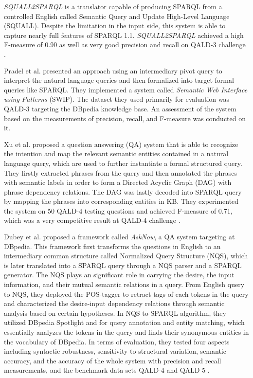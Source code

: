 \textit{SQUALL2SPARQL} \cite{ferre:hal-00943522} is a translator capable of producing SPARQL from a controlled English called Semantic Query and Update High-Level Language (SQUALL). Despite the limitation in the input side, this system is able to capture nearly full features of SPARQL 1.1. \textit{SQUALL2SPARQL} achieved a high F-measure of 0.90 as well as very good precision and recall on QALD-3 challenge \cite{cabrio2013qald}.

Pradel et al. \cite{Pradel2013} presented an approach using an intermediary pivot query to interpret the natural language queries and then formalized into target formal queries like SPARQL. They implemented a system called \textit{Semantic Web Interface using Patterns} (SWIP). The dataset they used primarily for evaluation was QALD-3 targeting the DBpedia knowledge base. An assessment of the system based on the measurements of precision, recall, and F-measure was conducted on it. 

Xu et al. \cite{Xu2014} proposed a question answering (QA) system that is able to recognize the intention and map the relevant semantic entities contained in a natural language query, which are used to further instantiate a formal structured query. They firstly extracted phrases from the query and then  annotated the phrases with semantic labels in order to form a Directed Acyclic Graph (DAG) with phrase dependency relations. The DAG was lastly decoded into SPARQL query by mapping the phrases into corresponding entities in KB. They experimented the system on 50 QALD-4 testing questions and achieved F-measure of 0.71, which was a very competitive result at QALD-4 challenge \cite{unger:hal-01086472}.

Dubey et al. \cite{Dubey2016} proposed a framework called \textit{AskNow}, a QA system targeting at DBpedia. This framework first transforms the questions in English to an intermediary common structure called Normalized Query Structure (NQS), which is later translated into a SPARQL query through a NQS parser and a SPARQL generator. The NQS plays an significant role in carrying the desire, the input information, and their mutual semantic relations in a query. From English query to NQS, they deployed the POS-tagger to retract tags of each tokens in the query and characterized the desire-input dependency relations through semantic analysis based on certain hypotheses. In NQS to SPARQL algorithm, they utilized DBpedia Spotlight \cite{isem2013daiber} and  \cite{Miller:1995:WLD:219717.219748} for query annotation and entity matching, which essentially analyzes the tokens in the query and finds their synonymous entities in the vocabulary of DBpedia. In terms of evaluation, they tested four aspects including syntactic robustness, sensitivity to structural variation, semantic accuracy, and the accuracy of the whole system with precision and recall measurements, and the benchmark data sets QALD-4 and QALD 5 \cite{unger:hal-01086472,Unger2015}.

